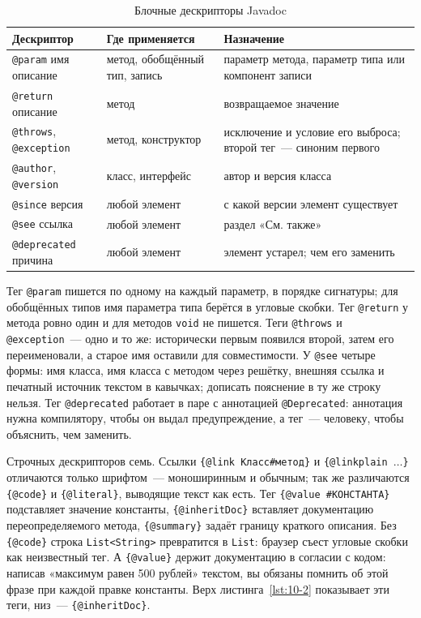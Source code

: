 \begin{table}[htbp]
\caption{Блочные дескрипторы Javadoc}
\label{tab:10-1}
\centering
\begin{tabular}{L{4.4cm}L{3.6cm}L{7cm}}
\toprule
Дескриптор & Где применяется & Назначение \\
\midrule
\texttt{@param} имя описание & метод, обобщённый тип, запись & параметр метода, параметр типа или компонент записи \\
\texttt{@return} описание & метод & возвращаемое значение \\
\texttt{@throws}, \texttt{@exception} & метод, конструктор & исключение и условие его выброса; второй тег~--- синоним первого \\
\texttt{@author}, \texttt{@version} & класс, интерфейс & автор и версия класса \\
\texttt{@since} версия & любой элемент & с какой версии элемент существует \\
\texttt{@see} ссылка & любой элемент & раздел «См. также» \\
\texttt{@deprecated} причина & любой элемент & элемент устарел; чем его заменить \\
\bottomrule
\end{tabular}
\end{table}

Тег \texttt{@param} пишется по одному на каждый параметр, в порядке сигнатуры; для обобщённых типов имя параметра типа берётся в угловые скобки. Тег \texttt{@return} у метода ровно один и для методов \texttt{void} не пишется. Теги \texttt{@throws} и \texttt{@exception}~--- одно и то же: исторически первым появился второй, затем его переименовали, а старое имя оставили для совместимости. У \texttt{@see} четыре формы: имя класса, имя класса с методом через решётку, внешняя ссылка и печатный источник текстом в кавычках; дописать пояснение в ту же строку нельзя. Тег \texttt{@deprecated} работает в паре с аннотацией \texttt{@Deprecated}: аннотация нужна компилятору, чтобы он выдал предупреждение, а тег~--- человеку, чтобы объяснить, чем заменить.

Строчных дескрипторов семь. Ссылки \texttt{\{@link Класс\#метод\}} и \texttt{\{@linkplain $\ldots$\}} отличаются только шрифтом~--- моноширинным и обычным; так же различаются \texttt{\{@code\}} и \texttt{\{@literal\}}, выводящие текст как есть. Тег \texttt{\{@value \#КОНСТАНТА\}} подставляет значение константы, \texttt{\{@inheritDoc\}} вставляет документацию переопределяемого метода, \texttt{\{@summary\}} задаёт границу краткого описания. Без \texttt{\{@code\}} строка \texttt{List<String>} превратится в \texttt{List}: браузер съест угловые скобки как неизвестный тег. А \texttt{\{@value\}} держит документацию в согласии с кодом: написав «максимум равен 500 рублей» текстом, вы обязаны помнить об этой фразе при каждой правке константы. Верх листинга~\ref{lst:10-2} показывает эти теги, низ~--- \texttt{\{@inheritDoc\}}.

